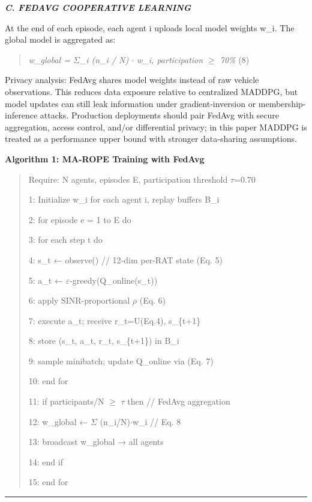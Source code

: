 \documentclass[journal,10pt,twocolumn]{IEEEtran}
\begin{document}
\emph{\textbf{C. FEDAVG COOPERATIVE LEARNING}}

At the end of each episode, each agent i uploads local model weights
w\_i. The global model is aggregated as:

\begin{quote}
\emph{w\_global = $\Sigma$\_i (n\_i / N) $\cdot$ w\_i, participation $\geq$ 70\%} (8)
\end{quote}

Privacy analysis: FedAvg shares model weights instead of raw vehicle
observations. This reduces data exposure relative to centralized MADDPG,
but model updates can still leak information under gradient-inversion or
membership-inference attacks. Production deployments should pair FedAvg
with secure aggregation, access control, and/or differential privacy; in
this paper MADDPG is treated as a performance upper bound with stronger
data-sharing assumptions.

\textbf{Algorithm 1: MA-ROPE Training with FedAvg}

\begin{quote}
Require: N agents, episodes E, participation threshold $\tau$=0.70

1: Initialize w\_i for each agent i, replay buffers B\_i

2: for episode e = 1 to E do

3: for each step t do

4: s\_t ← observe() // 12-dim per-RAT state (Eq. 5)

5: a\_t ← $\varepsilon$-greedy(Q\_online(s\_t))

6: apply SINR-proportional $\rho$ (Eq. 6)

7: execute a\_t; receive r\_t=U(Eq.4), s\_\{t+1\}

8: store (s\_t, a\_t, r\_t, s\_\{t+1\}) in B\_i

9: sample minibatch; update Q\_online via (Eq. 7)

10: end for

11: if \textbar participants\textbar/N $\geq$ $\tau$ then // FedAvg aggregation

12: w\_global ← $\Sigma$ (n\_i/N)$\cdot$w\_i // Eq. 8

13: broadcast w\_global → all agents

14: end if

15: end for
\end{quote}

\begin{center}\rule{0.5\linewidth}{0.5pt}\end{center}
\end{document}
